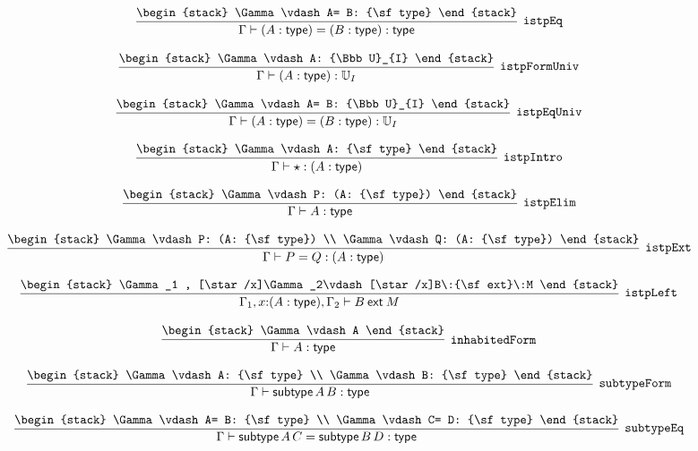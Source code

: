 \[
\infer[{\tt istpEq}]{\Gamma \vdash (A: {\sf type})= (B: {\sf type}): {\sf type}}{
\begin{stack}
\Gamma \vdash A= B: {\sf type}
\end{stack}}
\]

\[
\infer[{\tt istpFormUniv}]{\Gamma \vdash (A: {\sf type}): {\Bbb U}_{I}}{
\begin{stack}
\Gamma \vdash A: {\Bbb U}_{I}
\end{stack}}
\]

\[
\infer[{\tt istpEqUniv}]{\Gamma \vdash (A: {\sf type})= (B: {\sf type}): {\Bbb U}_{I}}{
\begin{stack}
\Gamma \vdash A= B: {\Bbb U}_{I}
\end{stack}}
\]

\[
\infer[{\tt istpIntro}]{\Gamma \vdash \star : (A: {\sf type})}{
\begin{stack}
\Gamma \vdash A: {\sf type}
\end{stack}}
\]

\[
\infer[{\tt istpElim}]{\Gamma \vdash A: {\sf type}}{
\begin{stack}
\Gamma \vdash P: (A: {\sf type})
\end{stack}}
\]

\[
\infer[{\tt istpExt}]{\Gamma \vdash P= Q: (A: {\sf type})}{
\begin{stack}
\Gamma \vdash P: (A: {\sf type})
\\
\Gamma \vdash Q: (A: {\sf type})
\end{stack}}
\]

\[
\infer[{\tt istpLeft}]{\Gamma_1 ,x\mathord{:}(A: {\sf type}), \Gamma_2 \vdash B\:{\sf ext}\:M}{
\begin{stack}
\Gamma_1 , [\star /x]\Gamma_2\vdash [\star /x]B\:{\sf ext}\:M
\end{stack}}
\]

\[
\infer[{\tt inhabitedForm}]{\Gamma \vdash A: {\sf type}}{
\begin{stack}
\Gamma \vdash A
\end{stack}}
\]

\[
\infer[{\tt subtypeForm}]{\Gamma \vdash {\sf subtype}\,A\,B: {\sf type}}{
\begin{stack}
\Gamma \vdash A: {\sf type}
\\
\Gamma \vdash B: {\sf type}
\end{stack}}
\]

\[
\infer[{\tt subtypeEq}]{\Gamma \vdash {\sf subtype}\,A\,C= {\sf subtype}\,B\,D: {\sf type}}{
\begin{stack}
\Gamma \vdash A= B: {\sf type}
\\
\Gamma \vdash C= D: {\sf type}
\end{stack}}
\]

